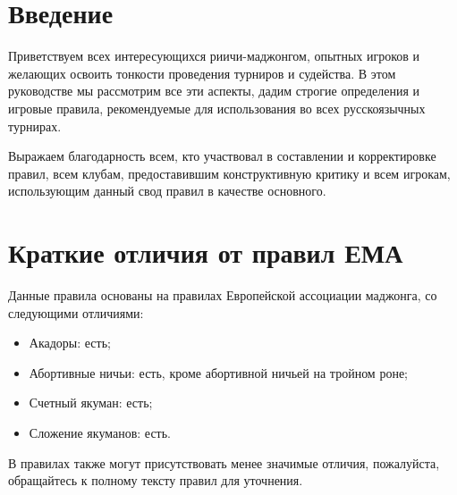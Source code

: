 \section{Введение}

Приветствуем всех интересующихся риичи-маджонгом, опытных игроков и желающих освоить тонкости проведения турниров и судейства. В этом руководстве мы рассмотрим все эти аспекты, дадим строгие определения и игровые правила, рекомендуемые для использования во всех русскоязычных турнирах.

Выражаем благодарность всем, кто участвовал в составлении и корректировке правил, всем клубам, предоставившим конструктивную критику и всем игрокам, использующим данный свод правил в качестве основного.

\newpage

\section{Краткие отличия от правил ЕМА}

Данные правила основаны на правилах Европейской ассоциации маджонга, со следующими отличиями:

\begin{itemize}
	\item Акадоры: есть;
	\item Абортивные ничьи: есть, кроме абортивной ничьей на тройном роне;
	\item Счетный якуман: есть;
	\item Сложение якуманов: есть.
\end{itemize}

В правилах также могут присутствовать менее значимые отличия, пожалуйста, обращайтесь к полному тексту правил для уточнения.